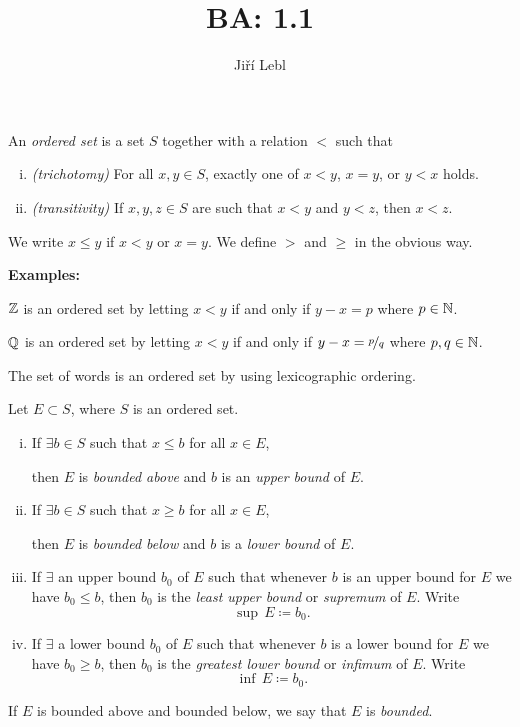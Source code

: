 \documentclass[10pt,aspectratio=169]{beamer}
\author{Ji\v{r}\'i Lebl}
\institute[OSU]{%
Departemento pri Matematiko de Oklahoma {\^S}tata Universitato}
\title{BA: 1.1}
\date{}
\begin{document}
\begin{frame}
\titlepage
\end{frame}

\begin{frame}
\begin{definition}
An \emph{ordered set} is a set $S$ together with
a relation $<$ such that
\pause
\begin{enumerate}[(i)]
\item \emph{(trichotomy)} For all $x, y \in S$, exactly one of
$x < y$, $x=y$, or $y < x$ holds.
\pause
\item \emph{(transitivity)} If $x,y,z \in S$ are such that $x < y$ and $y
< z$, then $x < z$.
\end{enumerate}
\pause
We write $x \leq y$ if $x < y$ or $x=y$.  We define
$>$ and $\geq$ in the obvious way.
\end{definition}
\pause

\textbf{Examples:}

\medskip

${\mathbb{Z}}$ is an ordered set by letting $x < y$ if and only if $y-x = p$ where $p \in {\mathbb{N}}$.

\medskip
\pause

${\mathbb{Q}}$ is an ordered set by letting $x < y$ if and only if $y-x = \nicefrac{p}{q}$ where $p,q \in {\mathbb{N}}$.

\medskip
\pause

The set of words is an ordered set by using lexicographic ordering.

\end{frame}

\begin{frame}

\begin{definition}
Let $E \subset S$, where $S$ is an ordered set.
\pause
\begin{enumerate}[(i)]
\item If $\exists b \in S$ such that $x \leq b$ for all $x \in E$,

then $E$ is \emph{bounded above} and $b$
is an \emph{upper bound} of $E$.
\pause
\item If $\exists b \in S$ such that $x \geq b$ for all $x \in E$,

then $E$ is \emph{bounded below} and $b$
is a \emph{lower bound} of $E$.
\pause
\item If $\exists$ an upper bound $b_0$ of $E$ such that whenever
$b$ is an upper bound for $E$ we have $b_0 \leq b$, then $b_0$
is the \emph{least upper bound} or
\emph{supremum}
of $E$.  Write
\[
\sup\, E \coloneqq b_0  .
\]
\item
\pause
If $\exists$ a lower bound $b_0$ of $E$ such that whenever
$b$ is a lower bound for $E$ we have $b_0 \geq b$, then $b_0$
is the \emph{greatest lower bound} or
\emph{infimum}
of $E$.  Write
\[
\inf\, E \coloneqq b_0  .
\]
\end{enumerate}
\pause
If $E$ is bounded above and bounded below, we say that
$E$ is \emph{bounded}.
\end{definition}
\end{frame}
\end{document}
